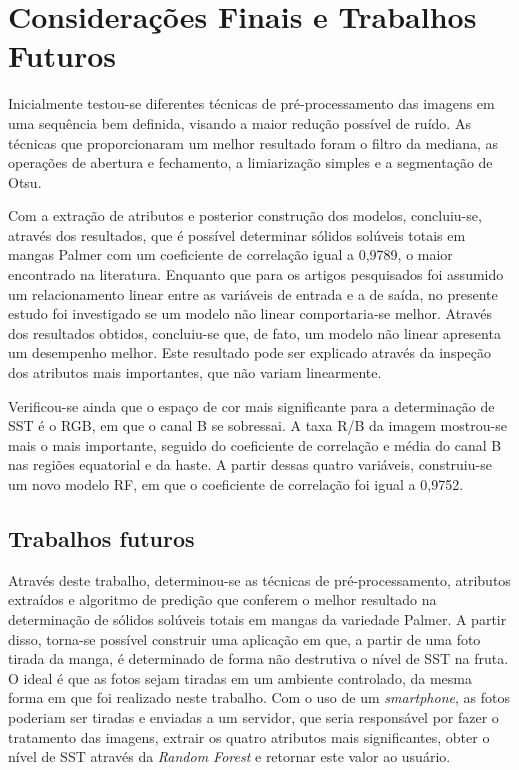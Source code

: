 \chapter{Considerações Finais e Trabalhos Futuros}

Inicialmente testou-se diferentes técnicas de pré-processamento das imagens em uma sequência bem definida, visando a maior redução possível de ruído. As técnicas que proporcionaram um melhor resultado foram o filtro da mediana, as operações de abertura e fechamento, a limiarização simples e a segmentação de Otsu.

Com a extração de atributos e posterior construção dos modelos, concluiu-se, através dos resultados, que é possível determinar sólidos solúveis totais em mangas Palmer com um coeficiente de correlação igual a 0,9789, o maior encontrado na literatura. Enquanto que para os artigos pesquisados foi assumido um relacionamento linear entre as variáveis de entrada e a de saída, no presente estudo foi investigado se um modelo não linear comportaria-se melhor. Através dos resultados obtidos, concluiu-se que, de fato, um modelo não linear apresenta um desempenho melhor. Este resultado pode ser explicado através da inspeção dos atributos mais importantes, que não variam linearmente.

Verificou-se ainda que o espaço de cor mais significante para a determinação de SST é o RGB, em que o canal B se sobressai. A taxa R/B da imagem mostrou-se mais o mais importante, seguido do coeficiente de correlação e média do canal B nas regiões equatorial e da haste. A partir dessas quatro variáveis, construiu-se um novo modelo RF, em que o coeficiente de correlação foi igual a 0,9752.  
 
\section{Trabalhos futuros}

Através deste trabalho, determinou-se as técnicas de pré-processamento, atributos extraídos e algoritmo de predição que conferem o melhor resultado na determinação de sólidos solúveis totais em mangas da variedade Palmer. A partir disso, torna-se possível construir uma aplicação em que, a partir de uma foto tirada da manga, é determinado de forma não destrutiva o nível de SST na fruta. O ideal é que as fotos sejam tiradas em um ambiente controlado, da mesma forma em que foi realizado neste trabalho. Com o uso de um \textit{smartphone}, as fotos poderiam ser tiradas e enviadas a um servidor, que seria responsável por fazer o tratamento das imagens, extrair os quatro atributos mais significantes, obter o nível de SST através da \textit{Random Forest} e retornar este valor ao usuário.  

